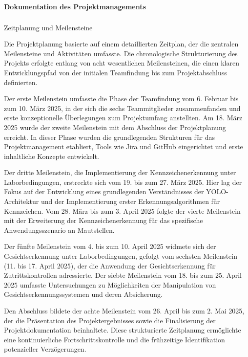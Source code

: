 \paragraph{Dokumentation des Projektmanagements}

\subparagraph{}{Zeitplanung und Meilensteine}

Die Projektplanung basierte auf einem detaillierten Zeitplan, der die zentralen Meilensteine und Aktivitäten umfasste. Die chronologische Strukturierung des Projekts erfolgte entlang von acht wesentlichen Meilensteinen, die einen klaren Entwicklungspfad von der initialen Teamfindung bis zum Projektabschluss definierten.

Der erste Meilenstein umfasste die Phase der Teamfindung vom 6. Februar bis zum 10. März 2025, in der sich die sechs Teammitglieder zusammenfanden und erste konzeptionelle Überlegungen zum Projektumfang anstellten. Am 18. März 2025 wurde der zweite Meilenstein mit dem Abschluss der Projektplanung erreicht. In dieser Phase wurden die grundlegenden Strukturen für das Projektmanagement etabliert, Tools wie Jira und GitHub eingerichtet und erste inhaltliche Konzepte entwickelt.

Der dritte Meilenstein, die Implementierung der Kennzeichenerkennung unter Laborbedingungen, erstreckte sich vom 19. bis zum 27. März 2025. Hier lag der Fokus auf der Entwicklung eines grundlegenden Verständnisses der YOLO-Architektur und der Implementierung erster Erkennungsalgorithmen für Kennzeichen. Vom 28. März bis zum 3. April 2025 folgte der vierte Meilenstein mit der Erweiterung der Kennzeichenerkennung für das spezifische Anwendungsszenario an Mautstellen.

Der fünfte Meilenstein vom 4. bis zum 10. April 2025 widmete sich der Gesichtserkennung unter Laborbedingungen, gefolgt vom sechsten Meilenstein (11. bis 17. April 2025), der die Anwendung der Gesichtserkennung für Zutrittskontrollen adressierte. Der siebte Meilenstein vom 18. bis zum 25. April 2025 umfasste Untersuchungen zu Möglichkeiten der Manipulation von Gesichtserkennungssystemen und deren Absicherung.

Den Abschluss bildete der achte Meilenstein vom 26. April bis zum 2. Mai 2025, der die Präsentation des Projektergebnisses sowie die Finalisierung der Projektdokumentation beinhaltete. Diese strukturierte Zeitplanung ermöglichte eine kontinuierliche Fortschrittskontrolle und die frühzeitige Identifikation potenzieller Verzögerungen.

